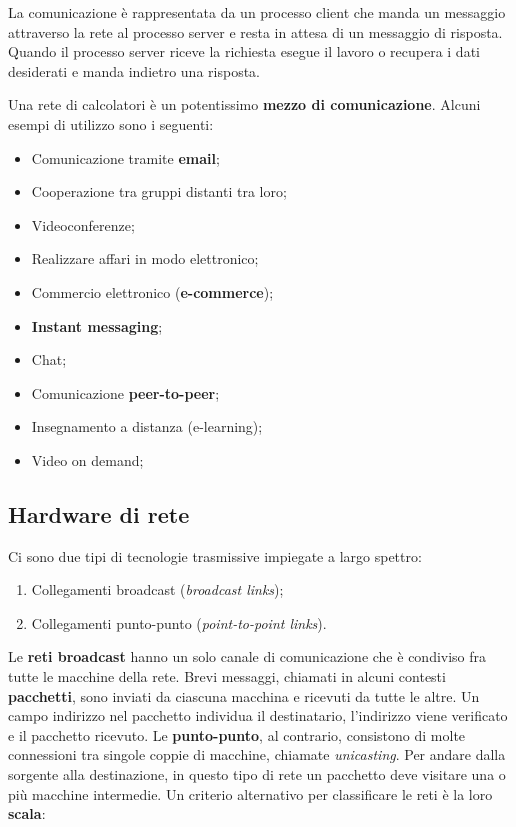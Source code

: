 La comunicazione è rappresentata da un processo client che manda un messaggio attraverso la rete al processo server e resta in attesa di un messaggio di risposta. Quando il processo server riceve la richiesta esegue il lavoro o recupera i dati desiderati e manda indietro una risposta.

Una rete di calcolatori è un potentissimo \textbf{mezzo di comunicazione}. Alcuni esempi di utilizzo sono i seguenti:

\begin{itemize}

\item Comunicazione tramite \textbf{email};
\item Cooperazione tra gruppi distanti tra loro;
\item Videoconferenze;
\item Realizzare affari in modo elettronico;
\item Commercio elettronico (\textbf{e-commerce});
\item \textbf{Instant messaging};
\item Chat;
\item Comunicazione \textbf{peer-to-peer};
\item Insegnamento a distanza (e-learning);
\item Video on demand;

\end{itemize} 

\subsection{Hardware di rete}

Ci sono due tipi di tecnologie trasmissive impiegate a largo spettro:

\begin{enumerate}

\item Collegamenti broadcast (\textit{broadcast links});
\item Collegamenti punto-punto (\textit{point-to-point links}).

\end{enumerate}

Le \textbf{reti broadcast} hanno un solo canale di comunicazione che è condiviso fra tutte le macchine della rete. Brevi messaggi, chiamati in alcuni contesti \textbf{pacchetti}, sono inviati da ciascuna macchina e ricevuti da tutte le altre. Un campo indirizzo nel pacchetto individua il destinatario, l'indirizzo viene verificato e il pacchetto ricevuto.
\linebreak
\linebreak
Le \textbf{punto-punto}, al contrario, consistono di molte connessioni tra singole coppie di macchine, chiamate \textit{unicasting}. Per andare dalla sorgente alla destinazione, in questo tipo di rete un pacchetto deve visitare una o più macchine intermedie.
\linebreak
\linebreak
Un criterio alternativo per classificare le reti è la loro \textbf{scala}:

